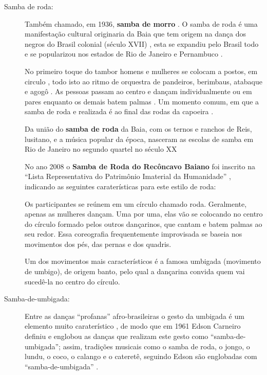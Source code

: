 \begin{description}
\item [Samba de roda:]
\label{ref:Samba-de-roda-danca}
Também chamado, em 1936, \textbf{samba de morro} \cite[pp. 18]{jornalsambaderoda3}.
O samba de roda é uma manifestação cultural originaria da Baia 
que tem origem na dança dos negros do Brasil colonial (século XVII) \cite{unescosambaderoda1} \cite[pp. 21]{brasilpandeiro} \cite{silva2009capoeira},
esta se expandiu pelo Brasil todo e se popularizou nos estados de Rio de Janeiro e Pernambuco \cite{silva2009capoeira}.


No primeiro toque do tambor homens e mulheres se colocam a postos,
em circulo \cite[pp. 21]{brasilpandeiro} \cite{silva2009capoeira},
todo isto ao ritmo de orquestra de pandeiros, berimbaus, atabaque e agogô  \cite{silva2009capoeira}.
As pessoas passam ao centro e dançam individualmente ou em pares enquanto os demais batem palmas \cite[pp. 21]{brasilpandeiro}.
Um momento comum, em que a samba de roda e realizada é ao final das rodas da capoeira \cite{silva2009capoeira}.

Da união do \textbf{samba de roda} da Baia, com os ternos e ranchos de Reis, lusitano, 
e a música popular da época, 
nasceram as escolas de samba em Rio de Janeiro no segundo quartel no século XX \cite[pp. 8]{jornalsambaderoda4}

No ano 2008 o \textbf{Samba de Roda do Recôncavo Baiano} foi inscrito na ``Lista Representativa 
do Patrimônio Imaterial da Humanidade'' \cite{unescosambaderoda1}, indicando as seguintes caraterísticas para este estilo de roda:
\begin{citando}
Os participantes se reúnem em um círculo chamado roda. 
Geralmente, apenas as mulheres dançam. 
Uma por uma, elas vão se colocando no centro do círculo formado pelos outros dançarinos, 
que cantam e batem palmas ao seu redor. 
Essa coreografia frequentemente improvisada se baseia nos movimentos dos pés, 
das pernas e dos quadris.

Um dos movimentos mais característicos é a famosa umbigada (movimento de umbigo), 
de origem banto, pelo qual a dançarina convida quem vai sucedê-la no centro do círculo.
\end{citando}
 
%

\item [Samba-de-umbigada:]
\label{ref:samba-de-umbigada}
Entre as danças ``profanas'' %
afro-brasileiras o gesto da umbigada é um elemento muito 
caraterístico \cite[pp. 32]{jornalsambaderoda2} \cite[pp. 85]{sandroni2001feitico},
de modo que em 1961 Edson Carneiro definiu e englobou as danças que realizam este 
gesto como ``samba-de-umbigada''; assim, tradições 
musicais como o samba de roda, o jongo, o lundu, o coco, o calango e o cateretê, 
seguindo Edson são englobadas com  ``samba-de-umbigada'' \cite[pp. 85]{sandroni2001feitico}.


\end{description}
